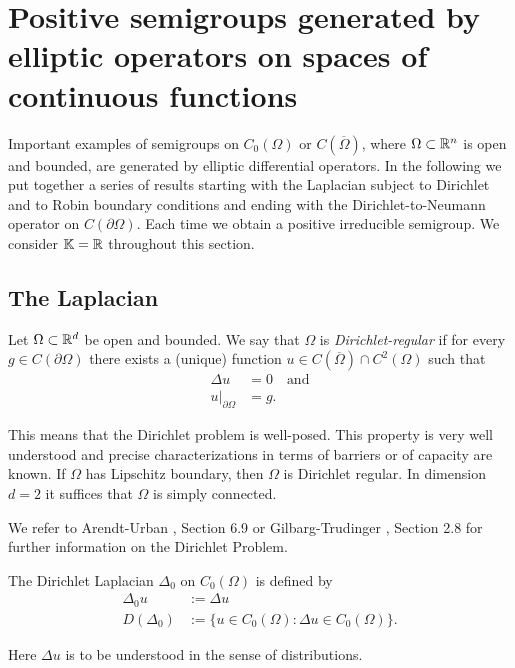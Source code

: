 \section{Positive semigroups generated by elliptic operators on spaces of continuous functions}
Important examples of semigroups on $C_0(\Omega)$ or $C(\overline{\Omega})$, where $\Omega \subset \mathbb{R}^n$ is open and bounded, are generated by elliptic differential operators. In the following we put together a series of results starting with the Laplacian subject to Dirichlet and to Robin boundary conditions and ending with the Dirichlet-to-Neumann operator on $C(\partial\Omega)$. Each time we obtain a positive irreducible semigroup. We consider $\mathbb{K} = \mathbb{R}$ throughout this section.

\subsection{The Laplacian}

Let $\Omega \subset \mathbb{R}^d$ be open and bounded. We say that $\Omega$ is \emph{Dirichlet-regular} if for every $g \in C(\partial\Omega)$ there exists a (unique) function $u \in C(\overline{\Omega}) \cap C^2(\Omega)$ such that
\begin{align}
\Delta u &= 0 \quad \text{and} \\
u|_{\partial\Omega} &= g.
\end{align} 

This means that the Dirichlet problem is well-posed. This property is very well understood and precise characterizations in terms of barriers or of capacity are known. If $\Omega$ has Lipschitz boundary, then $\Omega$ is Dirichlet regular. In dimension $d = 2$ it suffices that $\Omega$ is simply connected.

We refer to Arendt-Urban \cite{Au23}, Section 6.9 or Gilbarg-Trudinger \cite{GT83}, Section 2.8 for further information on the Dirichlet Problem.

The Dirichlet Laplacian $\Delta_0$ on $C_0(\Omega)$ is defined by
\begin{align}
\Delta_0 u &:= \Delta u \\
D(\Delta_0) &:= \{u \in C_0(\Omega) : \Delta u \in C_0(\Omega)\}.
\end{align}

Here $\Delta u$ is to be understood in the sense of distributions.

